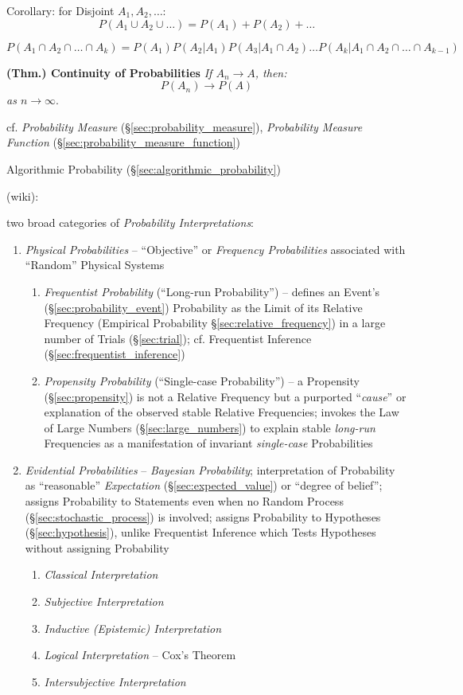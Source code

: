 Corollary: for Disjoint $A_1, A_2, \ldots$:
\[
  P(A_1 \cup A_2 \cup \ldots) = P(A_1) + P(A_2) + \ldots
\]

$P(A_1 \cap A_2 \cap \ldots \cap A_k) = P(A_1) P(A_2 | A_1) P(A_3 |
A_1 \cap A_2) \ldots P(A_k | A_1 \cap A_2 \cap \ldots \cap A_{k-1})$

\textbf{(Thm.) Continuity of Probabilities} \emph{If $A_n \to A$, then:}
\[
  P(A_n) \to P(A)
\]
\emph{as $n \to \infty$}.

cf. \emph{Probability Measure} (\S\ref{sec:probability_measure}),
\emph{Probability Measure Function} (\S\ref{sec:probability_measure_function})

\fist Algorithmic Probability (\S\ref{sec:algorithmic_probability})

(wiki):

two broad categories of \emph{Probability Interpretations}:
\begin{enumerate}
  \item \emph{Physical Probabilities} -- ``Objective'' or \emph{Frequency
    Probabilities} associated with ``Random'' Physical Systems
    \begin{enumerate}
      \item \emph{Frequentist Probability} (``Long-run Probability'') -- defines
        an Event's (\S\ref{sec:probability_event}) Probability as the Limit of
        its Relative Frequency (Empirical Probability
        \S\ref{sec:relative_frequency}) in a large number of Trials
        (\S\ref{sec:trial}); cf. Frequentist Inference
        (\S\ref{sec:frequentist_inference})
      \item \emph{Propensity Probability} (``Single-case Probability'') -- a
        Propensity (\S\ref{sec:propensity}) is not a Relative Frequency but a
        purported ``\emph{cause}'' or explanation of the observed stable
        Relative Frequencies; invokes the Law of Large Numbers
        (\S\ref{sec:large_numbers}) to explain stable \emph{long-run}
        Frequencies as a manifestation of invariant \emph{single-case}
        Probabilities
    \end{enumerate}
  \item \emph{Evidential Probabilities} -- \emph{Bayesian Probability};
    interpretation of Probability as ``reasonable'' \emph{Expectation}
    (\S\ref{sec:expected_value}) or ``degree of belief''; assigns Probability to
    Statements even when no Random Process (\S\ref{sec:stochastic_process}) is
    involved; assigns Probability to Hypotheses (\S\ref{sec:hypothesis}), unlike
    Frequentist Inference which Tests Hypotheses without assigning Probability
    \begin{enumerate}
      \item \emph{Classical Interpretation}
      \item \emph{Subjective Interpretation}
      \item \emph{Inductive (Epistemic) Interpretation}
      \item \emph{Logical Interpretation} -- Cox's Theorem
      \item \emph{Intersubjective Interpretation}
    \end{enumerate}
\end{enumerate}

